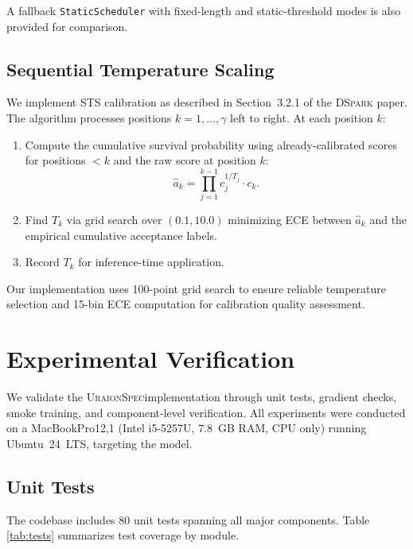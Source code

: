 \documentclass[11pt,a4paper]{article}
\newcommand{\UraionSpec}{\textsc{UraionSpec}}
\newcommand{\DSpark}{\textsc{DSpark}}
\begin{document}
A fallback \texttt{StaticScheduler} with fixed-length and static-threshold
modes is also provided for comparison.

\subsection{Sequential Temperature Scaling}
\label{subsec:sts}

We implement STS calibration as described in Section~3.2.1 of the \DSpark
paper. The algorithm processes positions $k = 1, \ldots, \gamma$ left to
right. At each position $k$:

\begin{enumerate}
  \item Compute the cumulative survival probability using already-calibrated
    scores for positions $<k$ and the raw score at position $k$:
    \[
    \hat{a}_k = \prod_{j=1}^{k-1} c_j^{1/T_j} \cdot c_k.
    \]
  \item Find $T_k$ via grid search over $(0.1, 10.0)$ minimizing ECE
    between $\hat{a}_k$ and the empirical cumulative acceptance labels.
  \item Record $T_k$ for inference-time application.
\end{enumerate}

Our implementation uses 100-point grid search to ensure reliable temperature
selection and 15-bin ECE computation for calibration quality assessment.

\section{Experimental Verification}
\label{sec:experiments}

We validate the \UraionSpec implementation through unit tests, gradient
checks, smoke training, and component-level verification. All experiments
were conducted on a MacBookPro12,1 (Intel i5-5257U, 7.8~GB RAM, CPU only)
running Ubuntu~24~LTS, targeting the  model.

\subsection{Unit Tests}
\label{subsec:unit-tests}

The codebase includes 80 unit tests spanning all major components. Table
\ref{tab:tests} summarizes test coverage by module.
\end{document}
